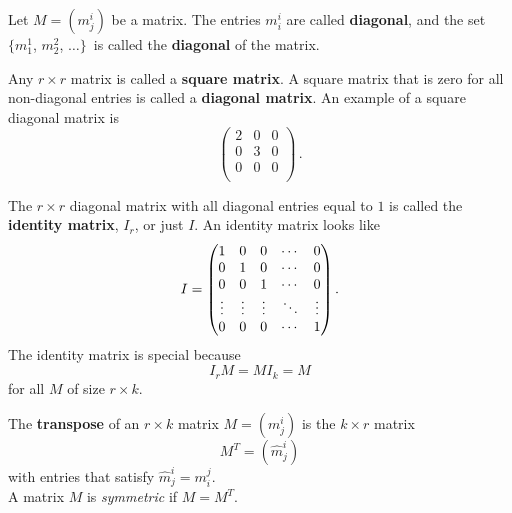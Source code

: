 \begin{definition}  
Let $M=(m^i_j)$ be a matrix. The entries $m_i^i$ are called {\bf diagonal}, and the set $\{m_1^1$, $m_2^2$, $\ldots \}$~is called the {\bf diagonal} of the matrix.

Any $r\times r$ matrix is called a {\bf square matrix}.  A square matrix that is zero for all non-diagonal entries is called a {\bf diagonal matrix}. An example of a square diagonal matrix is
$$\begin{pmatrix}
2 & 0 & 0\\
0 & 3 & 0\\
0 & 0 & 0\\
\end{pmatrix}\, .$$

The $r\times r$ diagonal matrix with all diagonal entries equal to $1$ is called the {\bf identity matrix}, $I_r$, or just $I$.  An identity matrix looks like \[ I=
\begin{pmatrix}
1 & 0 & 0 & \cdots & 0 \\
0 & 1 & 0 & \cdots & 0 \\
0 & 0 & 1 & \cdots & 0 \\
\multicolumn{1}{c}{\vdots} & \multicolumn{1}{c}{\vdots} & \multicolumn{1}{c}{\vdots} & \ddots & \multicolumn{1}{c}{\vdots} \\
0 & 0 & 0 & \cdots & 1
\end{pmatrix}.
\]
The identity matrix is special because $$I_rM=MI_k=M$$ for all $M$ of size $r\times k$.
\end{definition}



\begin{definition}
The {\bf transpose} of an $r\times k$ matrix $M = (m_j^i)$ is the $k\times r$ matrix 
\[
M^T = (\hat{m}_j^i)
\]
with entries that satisfy $\hat{m}_j^i = m_i^j$. \\

A matrix $M$ is \emph{symmetric} if $M=M^T$.
\end{definition}

